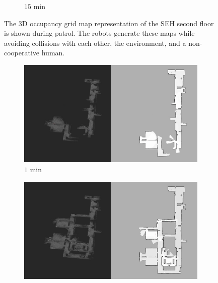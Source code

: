 \documentclass[smallextended]{svjour3}       %
\begin{document}
\begin{figure}[!t]
\begin{subfigure}[t]{0.38\columnwidth}
        		\caption{$15$ min}
		\vspace*{0.05\textwidth}
    	\end{subfigure}
	\caption{The 3D occupancy grid map representation of the SEH second floor is shown during patrol. The robots generate these maps while avoiding collisions with each other, the environment, and a non-cooperative human.}
	\label{fig:sim3DMap}
\end{figure}

\begin{figure}[!t]
\centering
    	\begin{subfigure}[t]{0.38\columnwidth}
           	\centering
          	\includegraphics[trim={35cm 0cm 0cm 0cm}, clip, width=\textwidth]{Patrol_Split_Screen_1min.jpg}
        		\caption{$1$ min}
		\vspace*{0.05\textwidth}
    	\end{subfigure}
	\hspace*{0.05\textwidth}
    	\begin{subfigure}[t]{0.38\columnwidth}
           	\centering
          	\includegraphics[trim={35cm 0cm 0cm 0cm}, clip, width=\textwidth]{Patrol_Split_Screen_3min.jpg}

\end{subfigure}
\end{figure}
\end{document}
